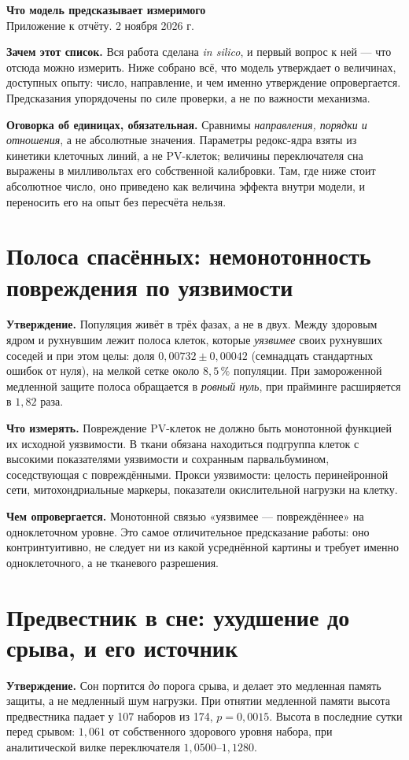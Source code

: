 \documentclass[11pt,a4paper]{article}
\begin{document}
\begin{center}
{\large\bfseries Что модель предсказывает измеримого}\\[2pt]
{\small Приложение к отчёту. 2 ноября 2026 г.}
\end{center}
\vspace{-2pt}

\noindent\textbf{Зачем этот список.} Вся работа сделана \emph{in silico}, и первый вопрос к ней ---
что отсюда можно измерить. Ниже собрано всё, что модель утверждает о величинах, доступных опыту:
число, направление, и чем именно утверждение опровергается. Предсказания упорядочены по силе
проверки, а не по важности механизма.

\noindent\textbf{Оговорка об единицах, обязательная.} Сравнимы \emph{направления, порядки и
отношения}, а не абсолютные значения. Параметры редокс-ядра взяты из кинетики клеточных линий, а не
PV-клеток; величины переключателя сна выражены в милливольтах его собственной калибровки. Там, где
ниже стоит абсолютное число, оно приведено как величина эффекта внутри модели, и переносить его на
опыт без пересчёта нельзя.

\section{Полоса спасённых: немонотонность повреждения по уязвимости}
\textbf{Утверждение.} Популяция живёт в трёх фазах, а не в двух. Между здоровым ядром и рухнувшим
лежит полоса клеток, которые \emph{уязвимее} своих рухнувших соседей и при этом целы: доля
$0{,}00732\pm0{,}00042$ (семнадцать стандартных ошибок от нуля), на мелкой сетке около $8{,}5\,\%$
популяции. При замороженной медленной защите полоса обращается в \emph{ровный нуль}, при прайминге
расширяется в $1{,}82$ раза.

\textbf{Что измерять.} Повреждение PV-клеток не должно быть монотонной функцией их исходной
уязвимости. В ткани обязана находиться подгруппа клеток с высокими показателями уязвимости и
сохранным парвальбумином, соседствующая с повреждёнными. Прокси уязвимости: целость перинейронной
сети, митохондриальные маркеры, показатели окислительной нагрузки на клетку.

\textbf{Чем опровергается.} Монотонной связью «уязвимее --- повреждённее» на одноклеточном уровне.
Это самое отличительное предсказание работы: оно контринтуитивно, не следует ни из какой усреднённой
картины и требует именно одноклеточного, а не тканевого разрешения.

\section{Предвестник в сне: ухудшение до срыва, и его источник}
\textbf{Утверждение.} Сон портится \emph{до} порога срыва, и делает это медленная память защиты, а
не медленный шум нагрузки. При отнятии медленной памяти высота предвестника падает у 107 наборов из
174, $p=0{,}0015$. Высота в последние сутки перед срывом: $1{,}061$ от собственного здорового уровня
набора, при аналитической вилке переключателя $1{,}0500$--$1{,}1280$.
\end{document}

